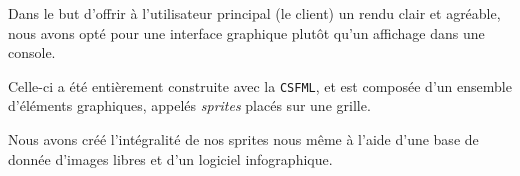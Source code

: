 Dans le but d'offrir à l'utilisateur principal (le client) un rendu clair et agréable, nous avons opté pour une interface graphique plutôt qu'un affichage dans une console.

Celle-ci a été entièrement construite avec la \texttt{CSFML}, et est composée d'un ensemble d'éléments graphiques, appelés \textit{sprites} placés sur une grille.

Nous avons créé l'intégralité de nos sprites nous même à l'aide d'une base de donnée d'images libres et d'un logiciel infographique. \\

\\



